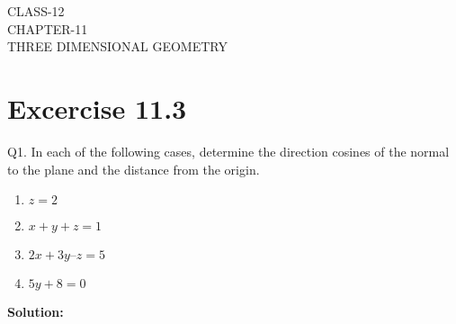 \documentclass[12pt]{article}
\newcommand{\solution}{\noindent \textbf{Solution: }}
\begin{document}
\begin{center}
\textbf\large{CLASS-12 \\ CHAPTER-11 \\ THREE DIMENSIONAL GEOMETRY}
\end{center}
\section*{Excercise 11.3}

Q1. In each of the following cases, determine the direction cosines of the normal to
the plane and the distance from the origin.
\begin{enumerate}
	\item $z=2$ 
	\item $x + y + z = 1$
	\item $2x + 3y – z = 5$
	\item $5y + 8 = 0$
\end{enumerate}
\solution
\end{document}
